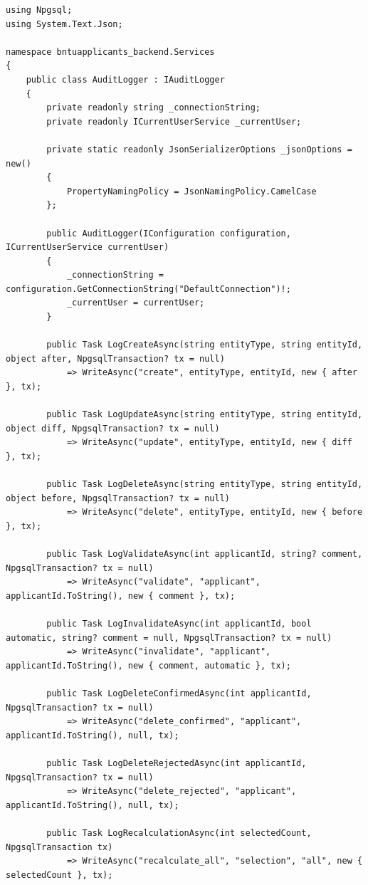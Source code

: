 \begin{lstlisting}[style=csharpstyle]
using Npgsql;
using System.Text.Json;

namespace bntuapplicants_backend.Services
{
    public class AuditLogger : IAuditLogger
    {
        private readonly string _connectionString;
        private readonly ICurrentUserService _currentUser;

        private static readonly JsonSerializerOptions _jsonOptions = new()
        {
            PropertyNamingPolicy = JsonNamingPolicy.CamelCase
        };

        public AuditLogger(IConfiguration configuration, ICurrentUserService currentUser)
        {
            _connectionString = configuration.GetConnectionString("DefaultConnection")!;
            _currentUser = currentUser;
        }

        public Task LogCreateAsync(string entityType, string entityId, object after, NpgsqlTransaction? tx = null)
            => WriteAsync("create", entityType, entityId, new { after }, tx);

        public Task LogUpdateAsync(string entityType, string entityId, object diff, NpgsqlTransaction? tx = null)
            => WriteAsync("update", entityType, entityId, new { diff }, tx);

        public Task LogDeleteAsync(string entityType, string entityId, object before, NpgsqlTransaction? tx = null)
            => WriteAsync("delete", entityType, entityId, new { before }, tx);

        public Task LogValidateAsync(int applicantId, string? comment, NpgsqlTransaction? tx = null)
            => WriteAsync("validate", "applicant", applicantId.ToString(), new { comment }, tx);

        public Task LogInvalidateAsync(int applicantId, bool automatic, string? comment = null, NpgsqlTransaction? tx = null)
            => WriteAsync("invalidate", "applicant", applicantId.ToString(), new { comment, automatic }, tx);

        public Task LogDeleteConfirmedAsync(int applicantId, NpgsqlTransaction? tx = null)
            => WriteAsync("delete_confirmed", "applicant", applicantId.ToString(), null, tx);

        public Task LogDeleteRejectedAsync(int applicantId, NpgsqlTransaction? tx = null)
            => WriteAsync("delete_rejected", "applicant", applicantId.ToString(), null, tx);

        public Task LogRecalculationAsync(int selectedCount, NpgsqlTransaction tx)
            => WriteAsync("recalculate_all", "selection", "all", new { selectedCount }, tx);


\end{lstlisting}
